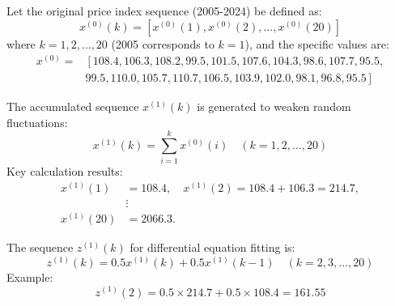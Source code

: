 \documentclass{mcmthesis}
\begin{document}
Let the original price index sequence (2005-2024) be defined as:
\begin{equation}
x^{(0)}(k) = \left[ x^{(0)}(1), x^{(0)}(2), \dots, x^{(0)}(20) \right]
\label{eq:original_sequence}
\end{equation}
where \( k = 1,2,\dots,20 \) (2005 corresponds to \( k=1 \)), and the specific values are:
\[
\begin{aligned}
x^{(0)} =& \left[ 108.4, 106.3, 108.2, 99.5, 101.5, 107.6, 104.3, 98.6, 107.7, 95.5, \right. \\
& \left. 99.5, 110.0, 105.7, 110.7, 106.5, 103.9, 102.0, 98.1, 96.8, 95.5 \right]
\end{aligned}
\]

The accumulated sequence \( x^{(1)}(k) \) is generated to weaken random fluctuations:
\begin{equation}
x^{(1)}(k) = \sum_{i=1}^{k} x^{(0)}(i) \quad (k=1,2,\dots,20)
\label{eq:1-AGO}
\end{equation}
Key calculation results:
\[
\begin{aligned}
x^{(1)}(1) &= 108.4, \quad x^{(1)}(2) = 108.4 + 106.3 = 214.7, \\
&\vdots \\
x^{(1)}(20) &= 2066.3.
\end{aligned}
\]

The sequence \( z^{(1)}(k) \) for differential equation fitting is:
\begin{equation}
z^{(1)}(k) = 0.5x^{(1)}(k) + 0.5x^{(1)}(k-1) \quad (k=2,3,\dots,20)
\label{eq:neighbor_mean}
\end{equation}
Example:
\begin{equation}
z^{(1)}(2) = 0.5 \times 214.7 + 0.5 \times 108.4 = 161.55
\label{eq:neighbor_example}
\end{equation}
\end{document}

